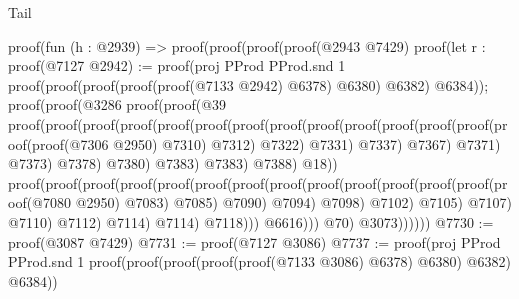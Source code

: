 \begin{lexlean}{Tail}
\begin{coremodule}
            proof(fun (h : @2939) =>
              proof(proof(proof(proof(@2943 @7429)
                      proof(let r : proof(@7127
                            @2942) := proof(proj PProd PProd.snd 1
                          proof(proof(proof(proof(proof(@7133 @2942) @6378) @6380) @6382) @6384));
                        proof(proof(@3286
                              proof(proof(@39
                                    proof(proof(proof(proof(proof(proof(proof(proof(proof(proof(proof(proof(proof(proof(proof(@7306
                                                                    @2950)
                                                                  @7310)
                                                                @7312)
                                                              @7322)
                                                            @7331)
                                                          @7337)
                                                        @7367)
                                                      @7371)
                                                    @7373)
                                                  @7378)
                                                @7380)
                                              @7383)
                                            @7383)
                                          @7388)
                                        @18))
                                  proof(proof(proof(proof(proof(proof(proof(proof(proof(proof(proof(proof(proof(proof(@7080
                                                                @2950)
                                                              @7083)
                                                            @7085)
                                                          @7090)
                                                        @7094)
                                                      @7098)
                                                    @7102)
                                                  @7105)
                                                @7107)
                                              @7110)
                                            @7112)
                                          @7114)
                                        @7114)
                                      @7118)))
                            @6616)))
                    @70)
                  @3073))))))
@7730 := proof(@3087 @7429)
@7731 := proof(@7127 @3086)
@7737 := proof(proj PProd PProd.snd 1
    proof(proof(proof(proof(proof(@7133 @3086) @6378) @6380) @6382) @6384))

\end{coremodule}
\end{lexlean}
